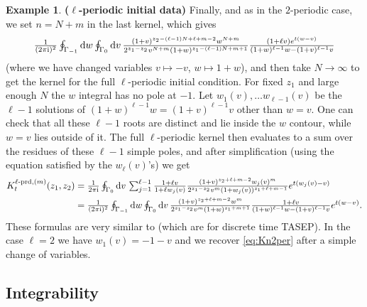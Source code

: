 \documentclass[letterpaper,reqno,11pt,oneside,final]{amsart}
\theoremstyle{definition}
\newtheorem{ex}[thm]{Example}
\newcommand{\I}{\uptext{i}}
\newcommand{\uptext}[1]{\text{\upshape{#1}}}
\renewcommand{\d}{\mathrm{d}}
\numberwithin{equation}{section}
\begin{document}
\begin{ex}{\bf ($\bm{\ell}$-periodic initial data)}
\noindent Finally, and as in the $2$-periodic case, we set $n=N+m$ in the last kernel, which gives
\begin{equation}
\textstyle\frac{1}{(2\pi\I)^2} \oint_{\Gamma_{-1}} \d w \oint_{\Gamma_0} \d v\, \frac{(1+v)^{z_2 - (\ell -1)N + \ell + m - 2} w^{N+m}}{2^{z_1 - z_2} v^{N+m} (1+w)^{z_1 -(\ell -1)N +m+1}} \frac{(1+\ell v) e^{t(w-v)}}{(1+w)^{\ell -1}w-(1+v)^{\ell -1}v}
\end{equation}
(where we have changed variables $v\longmapsto-v$, $w\longmapsto1+w$), and then take $N\to\infty$ to get the kernel for the full $\ell$-periodic initial condition.
For fixed $z_1$ and large enough $N$ the $w$ integral has no pole at $-1$.
Let $w_1(v),\dotsc w_{\ell-1}(v)$ be the $\ell-1$ solutions of $(1+w)^{\ell-1}w=(1+v)^{\ell-1}v$ other than $w=v$.
One can check that all these $\ell-1$ roots are distinct and lie inside the $w$ contour, while $w=v$ lies outside of it.
The full $\ell$-periodic kernel then evaluates to a sum over the residues of these $\ell-1$ simple poles, and after simplification (using the equation satisfied by the $w_\ell(v)$'s) we get
\begin{align}
\textstyle K^{\ell\uptext{-prd},(m)}_{t}(z_1,z_2) &= \textstyle\frac{1}{2\pi\I}\oint_{\Gamma_0} \d v\,\sum_{j=1}^{\ell-1}\frac{1+\ell v}{1+\ell w_j(v)}\frac{(1+v)^{z_2 + \ell + m - 2} w_j(v)^{m}}{2^{z_1 - z_2} v^{m} (1+w_j(v))^{z_1 + \ell + m - 1}}e^{t(w_j(v)-v)}\\
\textstyle&=\textstyle\frac{1}{(2\pi\I)^2} \oint_{\Gamma_{-1}} \d w \oint_{\Gamma_0} \d v\, \frac{(1+v)^{z_2 + \ell + m - 2} w^{m}}{2^{z_1 - z_2} v^{m} (1+w)^{z_1+m+1}} \frac{1+\ell v}{(1+w)^{\ell-1}w-(1+v)^{\ell-1}v}e^{t(w-v)}.
\end{align}
These formulas are very similar to \cite[Eqs. 2.3, 4.11]{bfp} (which are for discrete time TASEP).
In the case $\ell=2$ we have $w_1(v)=-1-v$ and we recover \eqref{eq:Kn2per} after a simple change of variables.
\end{ex}

\subsection{Integrability}\label{sec:integrability}
\end{document}
